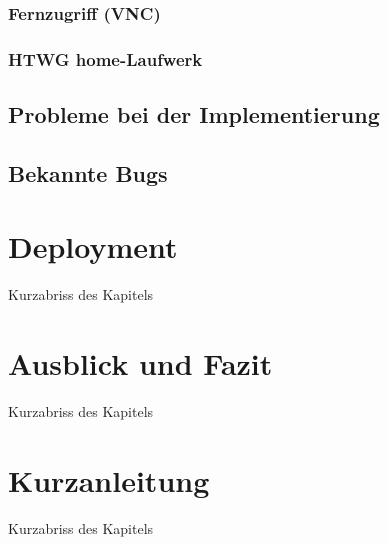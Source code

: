 \subsection{Fernzugriff (VNC)}

\subsection{HTWG home-Laufwerk}


\section{Probleme bei der Implementierung}

\section{Bekannte Bugs}

\chapter{Deployment}

Kurzabriss des Kapitels

\chapter{Ausblick und Fazit}

Kurzabriss des Kapitels

\chapter{Kurzanleitung}

Kurzabriss des Kapitels

		
   	\cleardoublepage
   	\setcounter{page}{12}
	 
	
\begin{appendix}   
\end{appendix}
\backmatter

